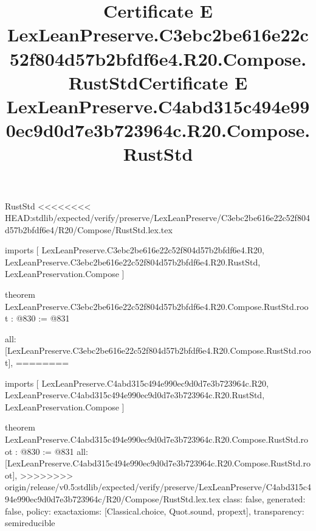 \begin{lexlean}{RustStd}
<<<<<<<< HEAD:stdlib/expected/verify/preserve/LexLeanPreserve/C3ebc2be616e22c52f804d57b2bfdf6e4/R20/Compose/RustStd.lex.tex
\title{Certificate E LexLeanPreserve.C3ebc2be616e22c52f804d57b2bfdf6e4.R20.Compose.RustStd}
\begin{coremodule}
imports [
  LexLeanPreserve.C3ebc2be616e22c52f804d57b2bfdf6e4.R20,
  LexLeanPreserve.C3ebc2be616e22c52f804d57b2bfdf6e4.R20.RustStd,
  LexLeanPreservation.Compose
]

theorem LexLeanPreserve.C3ebc2be616e22c52f804d57b2bfdf6e4.R20.Compose.RustStd.root : @830 := @831 {
  all: [LexLeanPreserve.C3ebc2be616e22c52f804d57b2bfdf6e4.R20.Compose.RustStd.root],
========
\title{Certificate E LexLeanPreserve.C4abd315c494e990ec9d0d7e3b723964c.R20.Compose.RustStd}
\begin{coremodule}
imports [
  LexLeanPreserve.C4abd315c494e990ec9d0d7e3b723964c.R20,
  LexLeanPreserve.C4abd315c494e990ec9d0d7e3b723964c.R20.RustStd,
  LexLeanPreservation.Compose
]

theorem LexLeanPreserve.C4abd315c494e990ec9d0d7e3b723964c.R20.Compose.RustStd.root : @830 := @831 {
  all: [LexLeanPreserve.C4abd315c494e990ec9d0d7e3b723964c.R20.Compose.RustStd.root],
>>>>>>>> origin/release/v0.5:stdlib/expected/verify/preserve/LexLeanPreserve/C4abd315c494e990ec9d0d7e3b723964c/R20/Compose/RustStd.lex.tex
  class: false,
  generated: false,
  policy: exact{axioms: [Classical.choice, Quot.sound, propext]},
  transparency: semireducible
}


\end{coremodule}}
\end{coremodule}
\end{lexlean}
